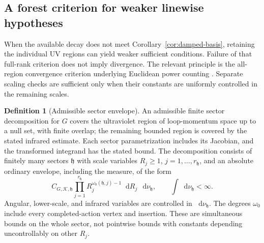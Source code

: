 \documentclass[final,5p,times,twocolumn,numbers,nopreprintline]{elsarticle}
\numberwithin{equation}{section}
\theoremstyle{definition}
\newtheorem{definition}[theorem]{Definition}
\theoremstyle{remark}
\newcommand{\dd}{\mathop{}\!\mathrm d}
\begin{document}
\subsection{A forest criterion for weaker linewise hypotheses}
\label{sec:forests}

When the available decay does not meet
Corollary~\ref{cor:damped-basis}, retaining the individual UV regions
can yield weaker sufficient conditions. Failure of that full-rank
criterion does not imply divergence. The relevant principle is the
all-region convergence criterion underlying Euclidean power counting
\cite{Weinberg1960}. Separate scaling checks are sufficient only when
their constants are uniformly controlled in the remaining scales.

\begin{definition}[Admissible sector envelope]
\label{def:sector-envelope}
An admissible finite sector decomposition for \(G\) covers the
ultraviolet region of loop-momentum space up to a null set, with
finite overlap; the remaining bounded region is covered by the
stated infrared estimate. Each sector parametrization includes its
Jacobian, and the transformed integrand has the stated bound.
The decomposition consists of finitely many sectors
\(\mathfrak h\) with scale variables
\(R_j\geq1\), \(j=1,\ldots,r_{\mathfrak h}\), and an absolute
ordinary envelope, including the measure, of the form
\begin{equation}
 C_{G,\mathcal K,\mathfrak h}
 \prod_{j=1}^{r_{\mathfrak h}}
     R_j^{\omega_0(\mathfrak h,j)-1}\dd R_j\,
 \dd\nu_{\mathfrak h},
 \qquad \int\dd\nu_{\mathfrak h}<\infty .
 \label{eq:sector-envelope}
\end{equation}
Angular, lower-scale, and infrared variables are controlled in
\(\dd\nu_{\mathfrak h}\). The degrees \(\omega_0\) include every
completed-action vertex and insertion. These are simultaneous
bounds on the whole sector, not pointwise bounds with constants
depending uncontrollably on other \(R_j\).
\end{definition}
\end{document}
